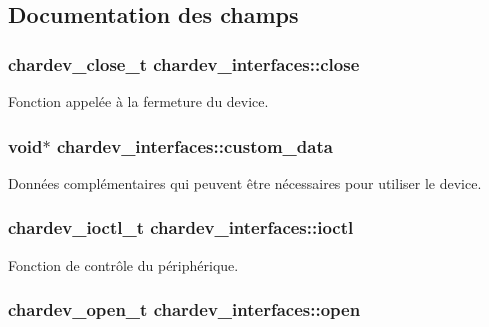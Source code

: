 \subsection{Documentation des champs}
\hypertarget{structchardev__interfaces_a9cba421c4dddc041e4b5029d011dbbd9}{
\subsubsection[{close}]{\setlength{\rightskip}{0pt plus 5cm}chardev\+\_\+close\+\_\+t chardev\+\_\+interfaces\+::close}}\label{structchardev__interfaces_a9cba421c4dddc041e4b5029d011dbbd9}
Fonction appelée à la fermeture du device. \hypertarget{structchardev__interfaces_a9b6b938d76fe7e20c93da8a032a42ad7}{
\subsubsection[{custom\+\_\+data}]{\setlength{\rightskip}{0pt plus 5cm}void$\ast$ chardev\+\_\+interfaces\+::custom\+\_\+data}}\label{structchardev__interfaces_a9b6b938d76fe7e20c93da8a032a42ad7}
Données complémentaires qui peuvent être nécessaires pour utiliser le device. \hypertarget{structchardev__interfaces_a9e5903e31e8e5ab21e9abc4b3a844e4a}{
\subsubsection[{ioctl}]{\setlength{\rightskip}{0pt plus 5cm}chardev\+\_\+ioctl\+\_\+t chardev\+\_\+interfaces\+::ioctl}}\label{structchardev__interfaces_a9e5903e31e8e5ab21e9abc4b3a844e4a}
Fonction de contrôle du périphérique. \hypertarget{structchardev__interfaces_a7962a67531ea5263a2f837c36fb18dc0}{
\subsubsection[{open}]{\setlength{\rightskip}{0pt plus 5cm}chardev\+\_\+open\+\_\+t chardev\+\_\+interfaces\+::open}}\label{structchardev__interfaces_a7962a67531ea5263a2f837c36fb18dc0}
